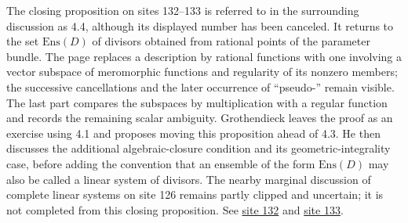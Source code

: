 The closing proposition on sites 132--133 is referred to in the surrounding discussion as 4.4, although its displayed number has been canceled. It returns to the set \(\mathrm{Ens}(D)\) of divisors obtained from rational points of the parameter bundle. The page replaces a description by rational functions with one involving a vector subspace of meromorphic functions and regularity of its nonzero members; the successive cancellations and the later occurrence of ``pseudo-'' remain visible. The last part compares the subspaces by multiplication with a regular function and records the remaining scalar ambiguity. Grothendieck leaves the proof as an exercise using 4.1 and proposes moving this proposition ahead of 4.3. He then discusses the additional algebraic-closure condition and its geometric-integrality case, before adding the convention that an ensemble of the form \(\mathrm{Ens}(D)\) may also be called a linear system of divisors. The nearby marginal discussion of complete linear systems on site 126 remains partly clipped and uncertain; it is not completed from this closing proposition. See \href{https://grothendieck.umontpellier.fr/web/viewer.html?file=../25.pdf#page=133}{site 132} and \href{https://grothendieck.umontpellier.fr/web/viewer.html?file=../25.pdf#page=134}{site 133}.

